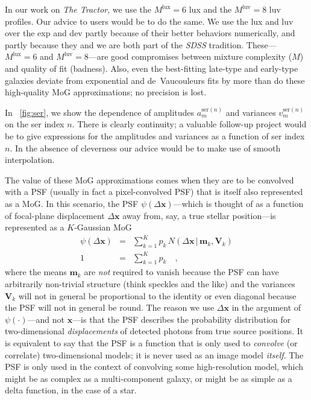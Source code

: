 \documentclass[12pt,pdftex,preprint]{aastex}
\newcommand{\project}[1]{\textsl{#1}}
\newcommand{\tmatrix}[1]{\boldsymbol{#1}}
\newcommand{\tvector}[1]{\boldsymbol{#1}}
\newcommand{\pos}{\tvector{x}}
\newcommand{\mean}{\tvector{m}}
\newcommand{\var}{\tmatrix{V}}
\newcommand{\normal}{N}
\newcommand{\given}{\,|\,}
\newcommand{\ser}{\mathrm{ser}}
\newcommand{\lux}{\mathrm{lux}}
\newcommand{\luv}{\mathrm{luv}}
\begin{document}
In our work on \project{The Tractor}, we use the $M^{\lux}=6$ lux and
the $M^{\luv}=8$ luv profiles.  Our advice to users would be to do the
same.  We use the lux and luv over the exp and dev partly because of
their better behaviors numerically, and partly because they and we are
both part of the \project{SDSS} tradition.  These---$M^{\lux}=6$ and
$M^{\luv}=8$---are good compromises between mixture complexity ($M$)
and quality of fit (badness).  Also, even the best-fitting late-type
and early-type galaxies deviate from exponential and de~Vaucouleurs
fits by more than do these high-quality MoG approximations; no
precision is lost.

In \figurename~\ref{fig:ser}, we show the dependence of amplitudes
$a^{\ser(n)}_m$ and variances $v^{\ser(n)}_m$ on the ser index $n$.
There is clearly continuity; a valuable follow-up project would be to
give expressions for the amplitudes and variances as a function of ser
index $n$.  In the absence of cleverness our advice would be to make
use of smooth interpolation.

The value of these MoG approximations comes when they are to be
convolved with a PSF (usually in fact a pixel-convolved PSF) that is
itself also represented as a MoG.  In this scenario, the PSF
$\psi(\Delta\pos)$---which is thought of as a function of focal-plane
displacement $\Delta\pos$ away from, say, a true stellar position---is
represented as a $K$-Gaussian MoG
\begin{eqnarray}\displaystyle
\psi(\Delta\pos) &=& \sum_{k=1}^K p_k\,\normal(\Delta\pos\given\mean_k,\var_k)
\\
1 &=& \sum_{k=1}^K p_k
\quad ,
\end{eqnarray}
where the means $\mean_k$ are \emph{not} required to vanish because
the PSF can have arbitrarily non-trivial structure (think speckles and
the like) and the variances $\var_k$ will not in general be
proportional to the identity or even diagonal because the PSF will not
in general be round.  The reason we use $\Delta\pos$ in the argument
of $\psi(\cdot)$---and not $\pos$---is that the PSF describes the
probability distribution for two-dimensional \emph{displacements} of
detected photons from true source positions.  It is equivalent to say
that the PSF is a function that is only used to \emph{convolve} (or
correlate) two-dimensional models; it is never used as an image model
\emph{itself}.  The PSF is only used in the context of convolving some
high-resolution model, which might be as complex as a multi-component
galaxy, or might be as simple as a delta function, in the case of a
star.
\end{document}

